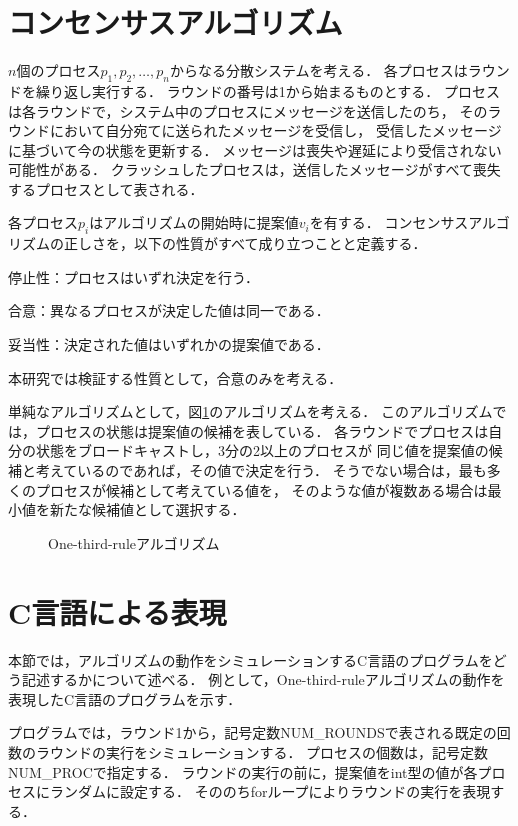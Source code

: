 \documentclass[technicalreport]{ieicej}
\theoremstyle{plain}
\begin{document}
\section{コンセンサスアルゴリズム}\label{sec:consensus}

$n$個のプロセス$p_1, p_2, \ldots, p_n$からなる分散システムを考える．
各プロセスはラウンドを繰り返し実行する．
ラウンドの番号は1から始まるものとする．
プロセスは各ラウンドで，システム中のプロセスにメッセージを送信したのち，
そのラウンドにおいて自分宛てに送られたメッセージを受信し，
受信したメッセージに基づいて今の状態を更新する．
メッセージは喪失や遅延により受信されない可能性がある．
クラッシュしたプロセスは，送信したメッセージがすべて喪失するプロセスとして表される．

各プロセス$p_i$はアルゴリズムの開始時に提案値$v_i$を有する．
コンセンサスアルゴリズムの正しさを，以下の性質がすべて成り立つことと定義する．

停止性：プロセスはいずれ決定を行う．

合意：異なるプロセスが決定した値は同一である．

妥当性：決定された値はいずれかの提案値である．

本研究では検証する性質として，合意のみを考える．

単純なアルゴリズムとして，図\ref{fig:onethird}のアルゴリズムを考える．
このアルゴリズムでは，プロセスの状態は提案値の候補を表している．
各ラウンドでプロセスは自分の状態をブロードキャストし，3分の2以上のプロセスが
同じ値を提案値の候補と考えているのであれば，その値で決定を行う．
そうでない場合は，最も多くのプロセスが候補として考えている値を，
そのような値が複数ある場合は最小値を新たな候補値として選択する．

\begin{figure}
	\centering
	\caption{One-third-ruleアルゴリズム}\label{fig:onethird}
\end{figure}


\section{C言語による表現}\label{sec:clang}

本節では，アルゴリズムの動作をシミュレーションするC言語のプログラムをどう記述するかについて述べる．
例として，One-third-ruleアルゴリズムの動作を表現したC言語のプログラムを示す．

プログラムでは，ラウンド1から，記号定数NUM\_ROUNDSで表される既定の回数のラウンドの実行をシミュレーションする．
プロセスの個数は，記号定数NUM\_PROCで指定する．
ラウンドの実行の前に，提案値をint型の値が各プロセスにランダムに設定する．
そののちforループによりラウンドの実行を表現する．
\end{document}
